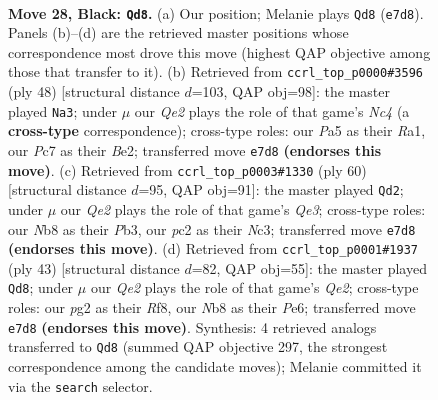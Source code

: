 \documentclass[11pt]{article}
\begin{document}
\clearpage

\begin{figure}[p]\centering
\begin{subfigure}{0.46\textwidth}\centering
\resizebox{\linewidth}{!}{%
\newchessgame
\chessboard[
  setfen={rn2r1k1/2pnq2p/1p2p1p1/p3Pp2/P2P1P1P/1R3NN1/2P3PQ/3K3R b - - 2 28},
  showmover=false,
  pgfstyle=straightmove, color=movearrow, markmove={e7-d8}
]}
\caption{}
\end{subfigure}\hfill
\begin{subfigure}{0.46\textwidth}\centering
\resizebox{\linewidth}{!}{%
\newchessgame
\chessboard[
  setfen={r1r3bk/2p1q1p1/1pn4p/3n1p2/P1NPp3/4P2P/1Q1NBPP1/R1R3K1 w - - 2 25},
  showmover=false,
  pgfstyle=straightmove, color=movearrow, markmove={c4-a3}
]}
\caption{}
\end{subfigure}
\\[4pt]
\begin{subfigure}{0.46\textwidth}\centering
\resizebox{\linewidth}{!}{%
\newchessgame
\chessboard[
  setfen={2r5/2qr1ppk/pp1ppnnp/8/2P1P3/1PNRQN1P/P4PP1/3R2K1 w - - 6 31},
  showmover=false,
  pgfstyle=straightmove, color=movearrow, markmove={e3-d2}
]}
\caption{}
\end{subfigure}\hfill
\begin{subfigure}{0.46\textwidth}\centering
\resizebox{\linewidth}{!}{%
\newchessgame
\chessboard[
  setfen={5r2/1r2q1pk/R2ppnnp/1pp1p3/4P3/3PPN1P/1PP2NP1/R2Q2K1 b - - 9 22},
  showmover=false,
  pgfstyle=straightmove, color=movearrow, markmove={e7-d8}
]}
\caption{}
\end{subfigure}
\caption{\textbf{Move 28, Black: \texttt{Qd8}.} (a) Our position; Melanie plays \texttt{Qd8} (\texttt{e7d8}). Panels (b)--(d) are the retrieved master positions whose correspondence most drove this move (highest QAP objective among those that transfer to it). (b) Retrieved from \texttt{ccrl\_top\_p0000\#3596} (ply 48) [structural distance $d$=103, QAP obj=98]: the master played \texttt{Na3}; under $\mu$ our \emph{Qe2} plays the role of that game's \emph{Nc4} (a \textbf{cross-type} correspondence); cross-type roles: our \emph{P}a5 as their \emph{R}a1, our \emph{P}c7 as their \emph{B}e2; transferred move \texttt{e7d8} \textbf{(endorses this move)}. (c) Retrieved from \texttt{ccrl\_top\_p0003\#1330} (ply 60) [structural distance $d$=95, QAP obj=91]: the master played \texttt{Qd2}; under $\mu$ our \emph{Qe2} plays the role of that game's \emph{Qe3}; cross-type roles: our \emph{N}b8 as their \emph{P}b3, our \emph{p}c2 as their \emph{N}c3; transferred move \texttt{e7d8} \textbf{(endorses this move)}. (d) Retrieved from \texttt{ccrl\_top\_p0001\#1937} (ply 43) [structural distance $d$=82, QAP obj=55]: the master played \texttt{Qd8}; under $\mu$ our \emph{Qe2} plays the role of that game's \emph{Qe2}; cross-type roles: our \emph{p}g2 as their \emph{R}f8, our \emph{N}b8 as their \emph{P}e6; transferred move \texttt{e7d8} \textbf{(endorses this move)}. Synthesis: 4 retrieved analogs transferred to \texttt{Qd8} (summed QAP objective 297, the strongest correspondence among the candidate moves); Melanie committed it via the \texttt{search} selector.}
\label{fig:thought-m55}
\end{figure}
\end{document}
